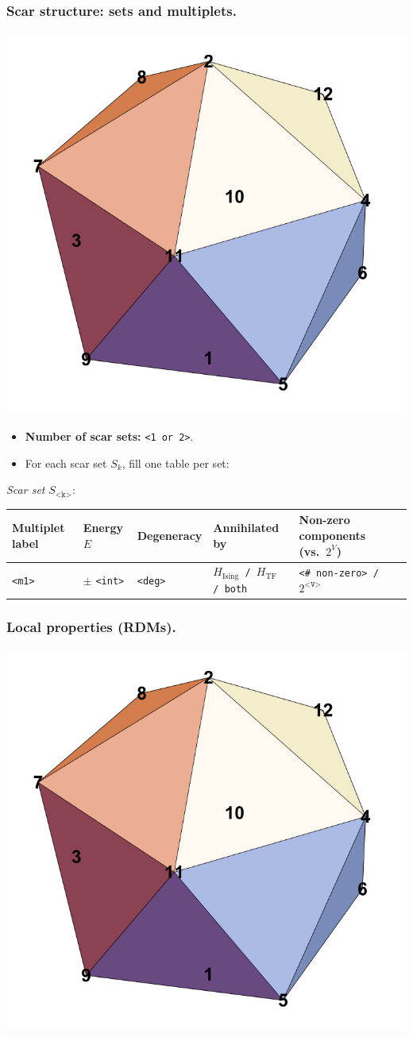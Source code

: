 \documentclass[11pt,a4paper]{article}
\newcommand{\Hising}{H_{\mathrm{Ising}}}
\newcommand{\Htf}{H_{\mathrm{TF}}}
\begin{document}
\subsubsection*{Scar structure: sets and multiplets.}
\begin{center}
  \includegraphics[width=.6\linewidth]{icosahedron}
\end{center}

\begin{itemize}[leftmargin=1.5em]
  \item \textbf{Number of scar sets:} \texttt{<1 or 2>}. 
  \item For each scar set $S_k$, fill one table per set:
\end{itemize}

\noindent\textit{Scar set} $S_{\texttt{<k>}}$:
\begin{center}
\begin{tabular}{L{3.5cm} C{2.2cm} C{2.2cm} C{2.2cm} C{3.0cm} C{3.2cm}}
\toprule
\textbf{Multiplet label} & \textbf{Energy $E$} & \textbf{Degeneracy} & \textbf{Annihilated by} & \textbf{Non-zero components (vs.\ $2^{V}$)} \\
\midrule
\texttt{<m1>} & $\pm$ \texttt{<int>} & \texttt{<deg> } &
\texttt{$\Hising$ / $\Htf$ / both} & \texttt{<\# non-zero> / $2^{\texttt{<V>}}$} \\
\bottomrule
\end{tabular}
\end{center}

\subsubsection*{Local properties (RDMs).}
\begin{center}
  \includegraphics[width=.6\linewidth]{icosahedron}
\end{center}
\end{document}
